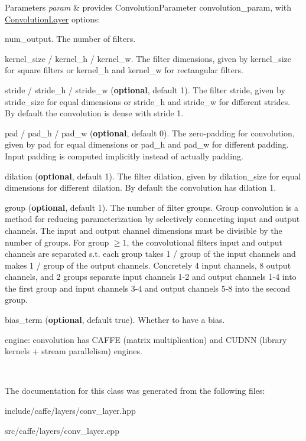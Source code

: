 \begin{DoxyParams}{Parameters}
{\em param} & provides Convolution\+Parameter convolution\+\_\+param, with \hyperlink{classcaffe_1_1ConvolutionLayer}{Convolution\+Layer} options\+:
\begin{DoxyItemize}
\item num\+\_\+output. The number of filters.
\item kernel\+\_\+size / kernel\+\_\+h / kernel\+\_\+w. The filter dimensions, given by kernel\+\_\+size for square filters or kernel\+\_\+h and kernel\+\_\+w for rectangular filters.
\item stride / stride\+\_\+h / stride\+\_\+w ({\bfseries optional}, default 1). The filter stride, given by stride\+\_\+size for equal dimensions or stride\+\_\+h and stride\+\_\+w for different strides. By default the convolution is dense with stride 1.
\item pad / pad\+\_\+h / pad\+\_\+w ({\bfseries optional}, default 0). The zero-\/padding for convolution, given by pad for equal dimensions or pad\+\_\+h and pad\+\_\+w for different padding. Input padding is computed implicitly instead of actually padding.
\item dilation ({\bfseries optional}, default 1). The filter dilation, given by dilation\+\_\+size for equal dimensions for different dilation. By default the convolution has dilation 1.
\item group ({\bfseries optional}, default 1). The number of filter groups. Group convolution is a method for reducing parameterization by selectively connecting input and output channels. The input and output channel dimensions must be divisible by the number of groups. For group $ \geq 1 $, the convolutional filters\textquotesingle{} input and output channels are separated s.\+t. each group takes 1 / group of the input channels and makes 1 / group of the output channels. Concretely 4 input channels, 8 output channels, and 2 groups separate input channels 1-\/2 and output channels 1-\/4 into the first group and input channels 3-\/4 and output channels 5-\/8 into the second group.
\item bias\+\_\+term ({\bfseries optional}, default true). Whether to have a bias.
\item engine\+: convolution has C\+A\+F\+FE (matrix multiplication) and C\+U\+D\+NN (library kernels + stream parallelism) engines. 
\end{DoxyItemize}\\
\hline
\end{DoxyParams}


The documentation for this class was generated from the following files\+:\begin{DoxyCompactItemize}
\item 
include/caffe/layers/conv\+\_\+layer.\+hpp\item 
src/caffe/layers/conv\+\_\+layer.\+cpp\end{DoxyCompactItemize}
